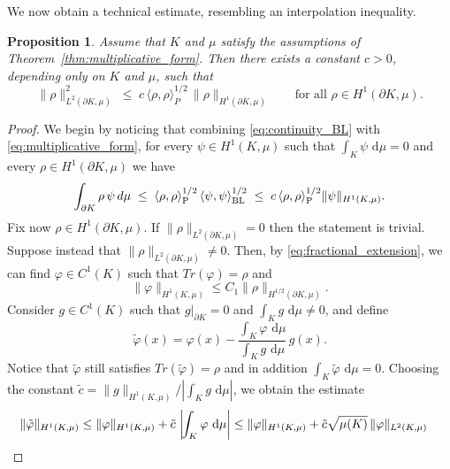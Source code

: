 \documentclass[a4paper, 11pt]{article}
\newtheorem{proposition}[theorem]{Proposition}
\theoremstyle{definition}
\newcommand{\di}{\, \mathrm{d}}
\begin{document}
We now obtain a technical estimate, resembling an interpolation inequality.
\begin{proposition}\label{prop:Boundary Sobolev form}
    Assume that $K$ and $\mu$ satisfy the assumptions of Theorem~\ref{thm:multiplicative_form}. Then there exists a constant $c>0$, depending only on $K$ and $\mu$, such that
    \[
    \|\rho\|^2_{L^2(\partial K, \mu)}
    \;\le\;
    c\, \langle \rho,\rho \rangle_P^{1/2}\,
       \|\rho\|_{H^{1}(\partial K,\mu)}
    \qquad\text{for all } \rho \in H^{1}(\partial K,\mu).
    \]
\end{proposition}
\begin{proof}
We begin by noticing that combining \eqref{eq:continuity_BL} with \eqref{eq:multiplicative_form}, for every $\psi \in H^{1}(K,\mu)$ such that $\int_{K}\psi \, \di \mu = 0$ and every $\rho \in H^{1}(\partial K,\mu)$ we have
    \begin{equation}\label{eq:Prop 3.1.2}
        \int_{\partial K} \rho\,\psi \, d\mu 
        \;\le\;
        \langle \rho,\rho \rangle_{\rm P}^{1/2}\,
        \langle \psi,\psi \rangle_{\rm BL}^{1/2}
        \;\le\;
        c\,\langle \rho,\rho \rangle_{\rm P}^{1/2}
        \|\psi \|_{H^{1}(K,\mu)} .
    \end{equation}
Fix now $\rho \in H^{1}(\partial K,\mu)$. If $\|\rho\|_{L^2(\partial K, \mu)}=0$ then the statement is trivial. Suppose instead that $\|\rho\|_{L^2(\partial K, \mu)}\neq0$. Then, by \eqref{eq:fractional_extension}, we can find $\varphi \in C^{1}(K)$ such that $Tr(\varphi) = \rho$ and
    \begin{equation}\label{eq:Prop 3.1.3}
        \|\varphi\|_{H^{1}(K,\mu)}
        \leq C_1 \|\rho\|_{H^{1/2}(\partial K,\mu)} .
    \end{equation}
Consider $g \in C^{1}(K)$ such that $g|_{\partial K} =0$ and $\int_{K} g\, \di\mu \neq 0$, and define
    \[\tilde{\varphi}(x) =  \varphi(x)- \frac{\int_K \varphi\, \di\mu}{\int_{K} g\, \di\mu}\, g(x). \]
    Notice that $\tilde{\varphi}$ still satisfies $Tr(\tilde{\varphi})= \rho$ and in addition $\int_{K}\tilde{\varphi}\, \di\mu =0$.  
    Choosing the constant $\tilde{c} =  \|g\|_{H^{1}(K,\mu)}/|\int_{K}g\, \di\mu|$, we obtain the estimate
    \begin{align}\label{eq:Prop 3.1.4}
        \notag
        \|\tilde{\varphi}\|_{H^{1}(K,\mu)}
        &\leq \|\varphi\|_{H^{1}(K,\mu)}
         + \tilde{c}\,\left|\!\int_{K}\varphi\, \di \mu\right|        \notag
        \leq \|\varphi\|_{H^{1}(K,\mu)}
          + \tilde{c}\sqrt{\mu(K)}\,\|\varphi\|_{L^2(K, \mu)}

\end{align}
\end{proof}
\end{document}
